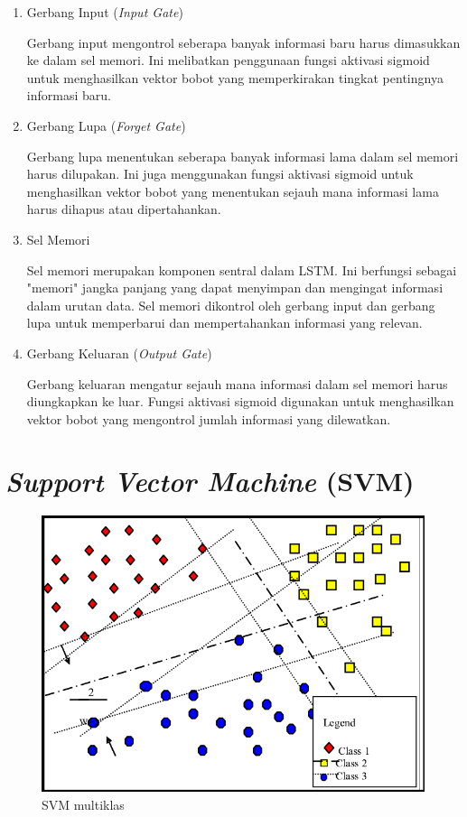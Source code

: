 \begin{enumerate}[nolistsep]
  \item Gerbang Input (\emph{Input Gate})

        Gerbang input mengontrol seberapa banyak informasi baru harus
        dimasukkan ke dalam sel memori. Ini melibatkan penggunaan fungsi
        aktivasi sigmoid untuk menghasilkan vektor bobot yang memperkirakan
        tingkat pentingnya informasi baru.

  \item Gerbang Lupa (\emph{Forget Gate})

        Gerbang lupa menentukan seberapa banyak informasi lama dalam sel
        memori harus dilupakan. Ini juga menggunakan fungsi aktivasi sigmoid
        untuk menghasilkan vektor bobot yang menentukan sejauh mana informasi
        lama harus dihapus atau dipertahankan.

  \item Sel Memori

        Sel memori merupakan komponen sentral dalam LSTM. Ini berfungsi
        sebagai "memori" jangka panjang yang dapat menyimpan dan mengingat
        informasi dalam urutan data. Sel memori dikontrol oleh gerbang input
        dan gerbang lupa untuk memperbarui dan mempertahankan informasi yang
        relevan.

  \item Gerbang Keluaran (\emph{Output Gate})

        Gerbang keluaran mengatur sejauh mana informasi dalam sel memori harus
        diungkapkan ke luar. Fungsi aktivasi sigmoid digunakan untuk menghasilkan
        vektor bobot yang mengontrol jumlah informasi yang dilewatkan.
\end{enumerate}

\section{\emph{Support Vector Machine} (SVM)}

\begin{figure} [H] \centering
  \includegraphics[scale=0.35]{gambar/SVM.png}
  \caption{SVM multiklas}
  \label{fig:SVM}
\end{figure}

